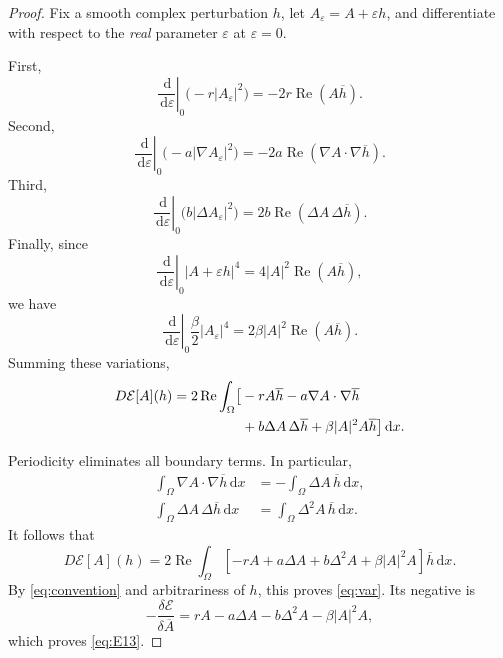\documentclass[11pt]{article}
\numberwithin{equation}{section}
\newcommand{\E}{\mathcal E}
\newcommand{\Om}{\Omega}
\newcommand{\dd}{\,\mathrm d}
\begin{document}
\begin{proof}
Fix a smooth complex perturbation $h$, let
$A_\varepsilon=A+\varepsilon h$, and differentiate
with respect to the \emph{real} parameter $\varepsilon$
at $\varepsilon=0$.

First,
\begin{equation}\label{eq:var1}
\left.\frac{\dd}{\dd\varepsilon}\right|_0
\bigl(-r|A_\varepsilon|^2\bigr)
=-2r\operatorname{Re}(A\overline h).
\end{equation}
Second,
\begin{equation}\label{eq:var2}
\left.\frac{\dd}{\dd\varepsilon}\right|_0
\bigl(-a|\nabla A_\varepsilon|^2\bigr)
=-2a\operatorname{Re}
(\nabla A\cdot\nabla\overline h).
\end{equation}
Third,
\begin{equation}\label{eq:var3}
\left.\frac{\dd}{\dd\varepsilon}\right|_0
\bigl(b|\Delta A_\varepsilon|^2\bigr)
=2b\operatorname{Re}(\Delta A\,\Delta\overline h).
\end{equation}
Finally, since
\[
\left.\frac{\dd}{\dd\varepsilon}\right|_0
|A+\varepsilon h|^4
=4|A|^2\operatorname{Re}(A\overline h),
\]
we have
\begin{equation}\label{eq:var4}
\left.\frac{\dd}{\dd\varepsilon}\right|_0
\frac{\beta}{2}|A_\varepsilon|^4
=2\beta|A|^2\operatorname{Re}(A\overline h).
\end{equation}
Summing these variations,
\begin{align}
D\E[A](h)
=2\operatorname{Re}\int_\Om\bigl[
&-rA\overline h
-a\nabla A\cdot\nabla\overline h \notag\\
&+b\Delta A\,\Delta\overline h
+\beta|A|^2A\overline h\bigr]\dd x.
\label{eq:firstvariation}
\end{align}

Periodicity eliminates all boundary terms. In particular,
\begin{align*}
\int_\Om\nabla A\cdot\nabla\overline h\dd x
&=-\int_\Om\Delta A\,\overline h\dd x,\\
\int_\Om\Delta A\,\Delta\overline h\dd x
&=\int_\Om\Delta^2 A\,\overline h\dd x.
\end{align*}
It follows that
\begin{equation}\label{eq:variationfinal}
D\E[A](h)=2\operatorname{Re}\int_\Om
\left[-rA+a\Delta A+b\Delta^2 A
+\beta|A|^2 A\right]\overline h\dd x.
\end{equation}
By \eqref{eq:convention} and arbitrariness of $h$,
this proves \eqref{eq:var}. Its negative is
\[
-\frac{\delta\E}{\delta\overline A}
=rA-a\Delta A-b\Delta^2A-\beta|A|^2A,
\]
which proves \eqref{eq:E13}.


\end{proof}
\end{document}
